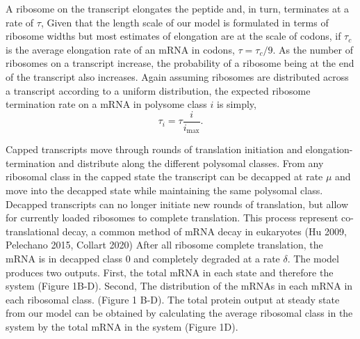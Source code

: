 \documentclass[review]{elsarticle}
\newcommand{\imax}{\ensuremath{{i_{\max}}}\xspace}
\begin{document}
A ribosome on the transcript elongates the peptide and, in turn, terminates at a rate of $\tau$, 
Given that the length scale of our model is formulated in terms of ribosome widths but most estimates of elongation are at the scale of codons, if $\tau_c$ is the average elongation rate of an mRNA in codons, $\tau = \tau_c/9$.
As the number of ribosomes on a transcript increase, the probability of a ribosome being at the end of the transcript also increases.
Again assuming ribosomes are distributed across a transcript according to a uniform distribution, the expected ribosome termination rate on a mRNA in polysome class $i$ is simply, 
\begin{equation}
	\tau_i = \tau \frac{i}{\imax}.
\end{equation}


Capped transcripts move through rounds of translation initiation and elongation-termination and distribute along the different polysomal classes. 
From any ribosomal class in the capped state the transcript can be decapped at rate $\mu$  and move into the decapped state while maintaining the same polysomal class.
Decapped transcripts can no longer initiate new rounds of translation, but allow for currently loaded ribosomes to complete translation. 
This process represent co-translational decay, a common method of mRNA decay in eukaryotes (Hu 2009, Pelechano 2015, Collart 2020) 
After all ribosome complete translation, the mRNA is in decapped class 0 and completely degraded at a rate $\delta$.
The model produces two outputs. 
First, the total mRNA in each state and therefore the system (Figure 1B-D). 
Second, The distribution of the mRNAs in each mRNA in each ribosomal class. (Figure 1 B-D).
The total protein output at steady state from our model can be obtained by calculating the average ribosomal class in the system by the total mRNA in the system (Figure 1D). 
\end{document}
